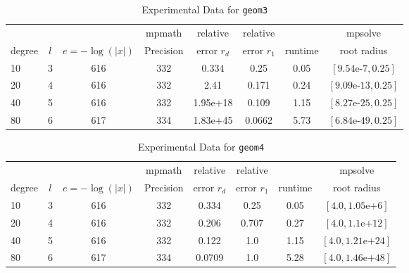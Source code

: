 \documentclass[sigconf]{acmart}
\begin{document}
\begin{table}[t]
\caption{Experimental Data for \texttt{geom3}} %
\label{tab:geom3}
\vskip -0.15in
\begin{center}
\begin{small}
\begin{sc}
\begin{tabular}{lccccccc}
\toprule
&  &  & mpmath & relative  & relative &  & mpsolve \\
degree  & $l$& $e=-\log(|x|)$& Precision &error $r_d$       & error $r_1$ &runtime& root radius\\
\midrule
 10 & 3 & 616 & 332 & 0.334 & 0.25 & 0.05 & $[9.54\text{e-}7, 0.25]$\\
 20 & 4 & 616 & 332 & 2.41 & 0.171 & 0.24 & $[9.09\text{e-}13, 0.25]$\\
 40 & 5 & 616 & 332 & 1.95e+18 & 0.109 & 1.15 & $[8.27\text{e-}25, 0.25]$\\
 80 & 6 & 617 & 334 & 1.83e+45 & 0.0662 & 5.73 & $[6.84\text{e-}49, 0.25]$\\
\bottomrule
\end{tabular}
\end{sc}
\end{small}
\end{center}
\vskip 0.05in
\end{table}


\begin{table}[t]
\caption{Experimental Data for \texttt{geom4}} %
\label{tab:geom4}
\vskip -0.15in
\begin{center}
\begin{small}
\begin{sc}
\begin{tabular}{lccccccc}
\toprule
&  &  & mpmath & relative  & relative &  & mpsolve \\
degree  & $l$& $e=-\log(|x|)$& Precision &error $r_d$       & error $r_1$ &runtime& root radius\\
\midrule
 10 & 3 & 616 & 332 & 0.334 & 0.25 & 0.05 & $[4.0, 1.05\text{e+}6]$\\
 20 & 4 & 616 & 332 & 0.206 & 0.707 & 0.27 & $[4.0, 1.1\text{e+}12]$\\
 40 & 5 & 616 & 332 & 0.122 & 1.0 & 1.15 & $[4.0, 1.21\text{e+}24]$\\
 80 & 6 & 617 & 334 & 0.0709 & 1.0 & 5.28 & $[4.0, 1.46\text{e+}48]$\\
\bottomrule
\end{tabular}
\end{sc}
\end{small}
\end{center}
\vskip 0.05in
\end{table}
\end{document}
